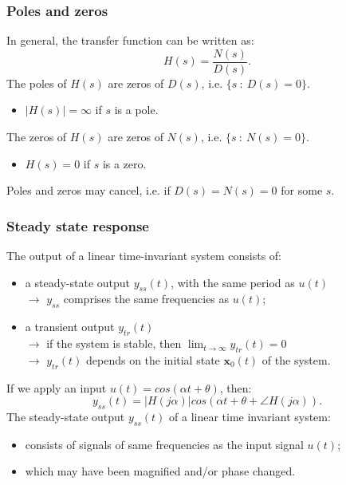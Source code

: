 \begin{frame}
\frametitle{Poles and zeros}
In general, the transfer function can be written as:
\begin{equation*}
H(s) = \frac{N(s)}{D(s)}.
\end{equation*}
The poles of $H(s)$ are zeros of $D(s)$, i.e. $\{s\ :\ D(s) = 0\}$.\\
\begin{itemize}
\item $|H(s)|=\infty$ if $s$ is a pole.
\end{itemize}
The zeros of $H(s)$ are zeros of $N(s)$, i.e. $\{s\ :\ N(s) = 0\}$. \\
\begin{itemize}
\item $H(s)=0$ if $s$ is a zero.
\end{itemize}
Poles and zeros may cancel, i.e. if $D(s)=N(s)=0$ for some $s$.
\end{frame}

\begin{frame}
\frametitle{Steady state response}
The output of a linear time-invariant system consists of:
\begin{itemize}
\item a steady-state output $y_{ss}(t)$, with the same period as $u(t)$ \\
$\rightarrow$ $y_{ss}$ comprises the same frequencies as $u(t)$; \\
\item a transient output $y_{tr}(t)$ \\
$\rightarrow$ if the system is stable, then $\lim_{t\rightarrow\infty} y_{tr}(t) = 0$  \\
$\rightarrow$ $y_{tr}(t)$ depends on the initial state $\mathbf{x}_0(t)$ of the system.
\end{itemize}
If we apply an input $u(t) = cos(\alpha t + \theta)$, then:
\begin{equation*}
y_{ss}(t) = |H(j\alpha)|cos(\alpha t + \theta + \angle H(j\alpha)).
\end{equation*}
The steady-state output $y_{ss}(t)$ of a linear time invariant system:
\begin{itemize}
\item consists of signals of same frequencies as the input signal $u(t)$;
\item which may have been magnified and/or phase changed.
\end{itemize}
\end{frame}

